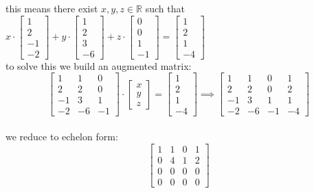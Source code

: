 \documentclass[a4paper,12pt]{article}
\begin{document}
\begin{definition}
\begin{my_example}
this means there exist \(x,y,z \in \mathbb{R}\) such that \(x\cdot \left[\begin{array}{r} 1 \\ 2 \\ -1 \\ -2 \end{array}\right] +y\cdot \left[\begin{array}{r} 1 \\ 2 \\ 3 \\ -6 \end{array}\right] +z\cdot \left[\begin{array}{r} 0 \\ 0 \\ 1 \\ -1 \end{array}\right] = \left[\begin{array}{r} 1 \\ 2 \\ 1 \\ -4 \end{array}\right]\)\\
to solve this we build an augmented matrix:\\
\[\left[\begin{array}{rrr} 1 & 1 & 0 \\ 2 & 2 & 0 \\ -1 & 3 & 1 \\ -2 & -6 & -1 \end{array}\right] \cdot \left[\begin{array}{r} x \\ y \\ z \end{array}\right] = \left[\begin{array}{r} 1 \\ 2 \\ 1 \\ -4 \end{array}\right] \implies \left[\begin{array}{rrrr} 1 & 1 & 0 & 1 \\ 2 & 2 & 0 & 2 \\ -1 & 3 & 1 & 1 \\ -2 & -6 & -1 & -4 \end{array}\right]\]\\
we reduce to echelon form:\\
\[\left[\begin{array}{rrrr} 1 & 1 & 0 & 1 \\ 0 & 4 & 1 & 2 \\ 0 & 0 & 0 & 0 \\ 0 & 0 & 0 & 0 \end{array}\right]\]\\

\end{my_example}
\end{definition}
\end{document}

